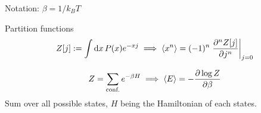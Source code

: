 \documentclass[main]{subfiles}
\begin{document}
Notation: $\beta = 1/k_BT$

\begin{multicols}{2}

Partition functions
\begin{gather}
    Z[j] := \int\dd{x} P(x) e^{-xj} \implies \langle x^n \rangle = (-1)^n \eval{\pdv[n]{Z[j]}{j}}_{j=0}
\end{gather}

\begin{gather}
    Z = \sum_{\text{conf.}} e^{-\beta H} \implies \langle E \rangle = -\pdv{\log Z}{\beta}
\end{gather}
Sum over all possible states, $H$ being the Hamiltonian of each states.

\end{multicols}
\end{document}

